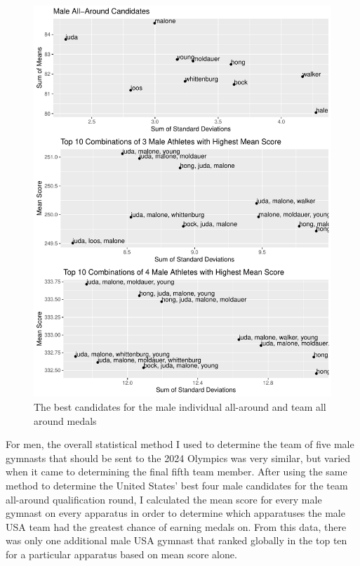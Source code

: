 \documentclass[12pt]{article}
\begin{document}
\begin{figure}
  \centering
  \includegraphics[scale=0.7]{MaleMultipleAllAround.pdf}
  \caption{The best candidates for the male individual all-around and team all around medals}
  \label{fig:MAA}
\end{figure}


For men, the overall statistical method I used to determine the team of five male gymnasts that should be sent 
to the 2024 Olympics was very similar, but varied when it came to determining the final fifth team member. After 
using the same method to determine the United States' best four male candidates for the team all-around qualification 
round, I calculated the mean score for every male gymnast on every apparatus in order to determine which apparatuses 
the male USA team had the greatest chance of earning medals on. From this data, there was only one additional male 
USA gymnast that ranked globally in the top ten for a particular apparatus based on mean score alone.
\end{document}
